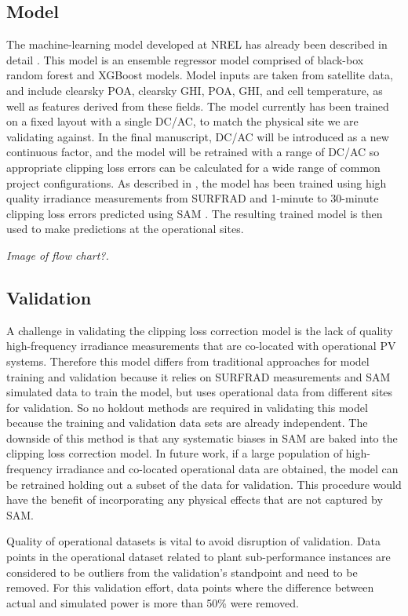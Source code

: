 \documentclass[conference]{IEEEtran}
\begin{document}
\subsection{Model}

The machine-learning model developed at NREL has already been described in detail \cite{Anderson2020}. This model is an ensemble regressor model comprised of black-box random forest and XGBoost models. Model inputs are taken from satellite data, and include clearsky POA, clearsky GHI, POA, GHI, and cell temperature, as well as features derived from these fields. The model currently has been trained on a fixed layout with a single DC/AC, to match the physical site we are validating against. In the final manuscript, DC/AC will be introduced as a new continuous factor, and the model will be retrained with a range of DC/AC so appropriate clipping loss errors can be calculated for a wide range of common project configurations. As described in \cite{Anderson2020}, the model has been trained using high quality irradiance measurements from SURFRAD \cite{Augustine2000} and 1-minute to 30-minute clipping loss errors predicted using SAM \cite{Freeman2018}. The resulting trained model is then used to make predictions at the operational sites.

\textit{\color{red}Image of flow chart?.}

\subsection{Validation}
A challenge in validating the clipping loss correction model is the lack of quality high-frequency irradiance measurements that are co-located with operational PV systems. Therefore this model differs from traditional approaches for model training and validation because it relies on SURFRAD measurements and SAM simulated data to train the model, but uses operational data from different sites for validation. So no holdout methods are required in validating this model because the training and validation data sets are already independent. The downside of this method is that any systematic biases in SAM are baked into the clipping loss correction model. In future work, if a large population of high-frequency irradiance and co-located operational data are obtained, the model can be retrained holding out a subset of the data for validation. This procedure would have the benefit of incorporating any physical effects that are not captured by SAM.

Quality of operational datasets is vital to avoid disruption of validation. Data points in the operational dataset related to plant sub-performance instances are considered to be outliers from the validation's standpoint and need to be removed. For this validation effort, data points where the difference between actual and simulated power is more than 50\% were removed. 
\end{document}
